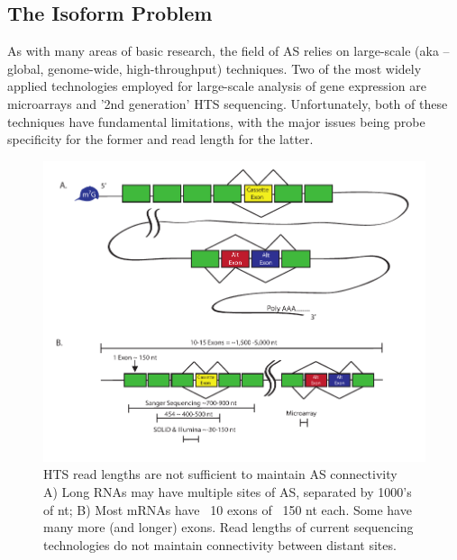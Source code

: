 \subsection{The Isoform Problem}

As with many areas of basic research, the field of AS relies on large-scale (aka – global, genome-wide, high-throughput) techniques. Two of the most widely applied technologies employed for large-scale analysis of gene expression are microarrays and '2nd generation' HTS sequencing. Unfortunately, both of these techniques have fundamental limitations, with the major issues being probe specificity for the former and read length for the latter.

\begin{figure}[htbp]
	\centering 
	\includegraphics{Figures/SeqLengths_and_Connectivity.pdf}
	\caption[HTS read lengths are not sufficient to maintain AS connectivity]
	{
		HTS read lengths are not sufficient to maintain AS connectivity\\[0.25cm]
		A) Long RNAs may have multiple sites of AS, separated by 1000's of nt; B) Most mRNAs have ~10 exons of ~150 nt each. Some have many more (and longer) exons. Read lengths of current sequencing technologies do not maintain connectivity between distant sites.
	}
	\label{fig:NoConnectivityInHTSMethods}
\end{figure}

